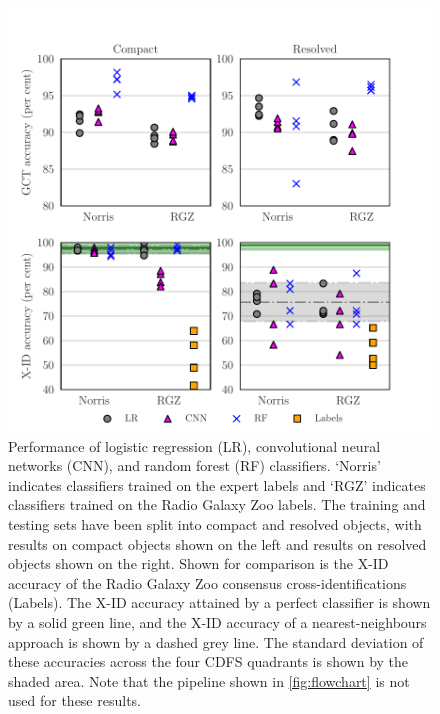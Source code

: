 \documentclass[fleqn,usenatbib,usedcolumn]{mnras}
\begin{document}
    \begin{figure}
    \centering
    \includegraphics[width=\columnwidth]{images/cdfs-grid-new.pdf}
    \caption{Performance of logistic regression (LR), convolutional neural networks (CNN), and random forest (RF) classifiers. `Norris' indicates classifiers trained on the expert labels and `RGZ' indicates classifiers trained on the Radio Galaxy Zoo labels. The training and testing sets have been split into compact and resolved objects, with results on compact objects shown on the left and results on resolved objects shown on the right. Shown for comparison is the X-ID accuracy of the Radio Galaxy Zoo consensus cross-identifications (Labels). The X-ID accuracy attained by a perfect classifier is shown by a solid green line, and the X-ID accuracy of a nearest-neighbours approach is shown by a dashed grey line. The standard deviation of these accuracies across the four CDFS quadrants is shown by the shaded area. Note that the pipeline shown in \autoref{fig:flowchart} is not used for these results.
        \label{fig:ba}}
    \end{figure}
\end{document}
